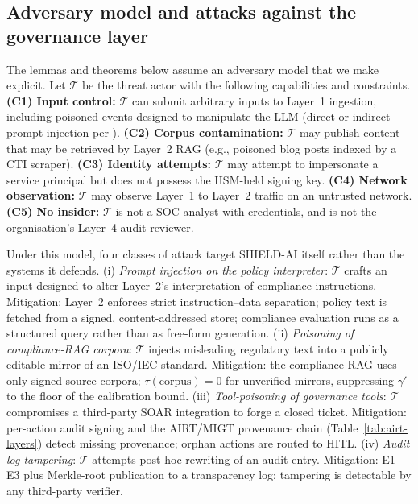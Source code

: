 \documentclass[preprint,12pt,authoryear]{elsarticle}
\begin{document}
\subsection{Adversary model and attacks against the governance layer}
\label{ssec:adversary}
The lemmas and theorems below assume an adversary model that we make explicit. Let $\mathcal{T}$ be the threat actor with the following capabilities and constraints. \textbf{(C1) Input control:} $\mathcal{T}$ can submit arbitrary inputs to Layer~1 ingestion, including poisoned events designed to manipulate the LLM (direct or indirect prompt injection per \citet{liu2024formalizing,greshake2023indirect,zou2023universal}). \textbf{(C2) Corpus contamination:} $\mathcal{T}$ may publish content that may be retrieved by Layer~2 RAG (e.g., poisoned blog posts indexed by a CTI scraper). \textbf{(C3) Identity attempts:} $\mathcal{T}$ may attempt to impersonate a service principal but does not possess the HSM-held signing key. \textbf{(C4) Network observation:} $\mathcal{T}$ may observe Layer~1 to Layer~2 traffic on an untrusted network. \textbf{(C5) No insider:} $\mathcal{T}$ is not a SOC analyst with credentials, and is not the organisation's Layer~4 audit reviewer.

Under this model, four classes of attack target SHIELD-AI itself rather than the systems it defends. (i) \emph{Prompt injection on the policy interpreter}: $\mathcal{T}$ crafts an input designed to alter Layer~2's interpretation of compliance instructions. Mitigation: Layer~2 enforces strict instruction--data separation; policy text is fetched from a signed, content-addressed store; compliance evaluation runs as a structured query rather than as free-form generation. (ii) \emph{Poisoning of compliance-RAG corpora}: $\mathcal{T}$ injects misleading regulatory text into a publicly editable mirror of an ISO/IEC standard. Mitigation: the compliance RAG uses only signed-source corpora; $\tau(\text{corpus}) = 0$ for unverified mirrors, suppressing $\gamma'$ to the floor of the calibration bound. (iii) \emph{Tool-poisoning of governance tools}: $\mathcal{T}$ compromises a third-party SOAR integration to forge a closed ticket. Mitigation: per-action audit signing and the AIRT/MIGT provenance chain (Table~\ref{tab:airt-layers}) detect missing provenance; orphan actions are routed to HITL. (iv) \emph{Audit log tampering}: $\mathcal{T}$ attempts post-hoc rewriting of an audit entry. Mitigation: E1--E3 plus Merkle-root publication to a transparency log; tampering is detectable by any third-party verifier.
\end{document}
